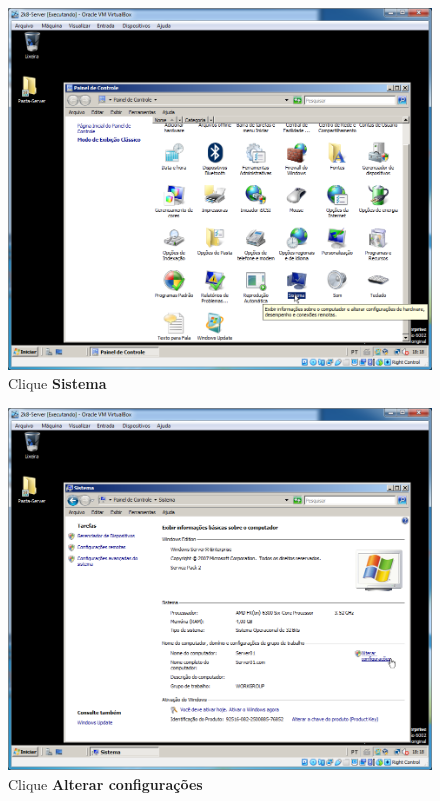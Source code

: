 \documentclass[10pt]{article}
\begin{document}
\begin{figure}[H]
    \centering
    \caption{Clique \textbf{Sistema}}
    \label{fig:ar011}
    \includegraphics[width=\linewidth]{images/acesso_remoto/ar011.png}
\end{figure}
\begin{figure}[H]
    \centering
    \caption{Clique \textbf{Alterar configurações}}
    \label{fig:ar012}
    \includegraphics[width=\linewidth]{images/acesso_remoto/ar012.png}
\end{figure}
\end{document}
